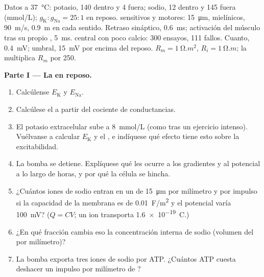 \begin{problem}
\label{pb:b2:neurons-synapses:1}
Datos a \qty{37}{\celsius}: potasio, 140 dentro y 4 fuera; sodio, 12
dentro y 145 fuera (\unit{mmol/L}); $g_{\mathrm K} : g_{\mathrm{Na}} = 25 : 1$
en reposo.  sensitivos y motores: \qty{15}{\micro m}, mielínicos,
\qty{90}{m/s}, \qty{0.9}{m} en cada sentido. Retraso sináptico,
\qty{0.6}{ms}; activación del músculo tras su propio ,
\qty{5}{ms}.  central con poco calcio: 300 ensayos, 111 fallos.
Cuanto, \qty{0.4}{mV}; umbral, \qty{15}{mV} por encima del reposo. $R_m =
\qty{1}{\ohm.m^2}$, $R_i = \qty{1}{\ohm.m}$; la  multiplica $R_m$
por 250.

\medskip
\noindent\textbf{Parte I --- La  en reposo.}
\begin{enumerate}
  \item Calcúlense $E_{\mathrm K}$ y $E_{\mathrm{Na}}$.
  \item Calcúlese el  a partir del cociente de
        conductancias.
  \item El potasio extracelular sube a \qty{8}{mmol/L} (como tras un
        ejercicio intenso). Vuélvanse a calcular $E_{\mathrm K}$ y el
        , e indíquese qué efecto tiene esto sobre la
        excitabilidad.
  \item La bomba se detiene. Explíquese qué les ocurre a los gradientes y
        al potencial a lo largo de horas, y por qué la célula se hincha.
  \item ¿Cuántos iones de sodio entran en un  de \qty{15}{\micro m} por
        milímetro y por impulso si la capacidad de la membrana es de
        \qty{0.01}{F/m^2} y el potencial varía \qty{100}{mV}?
        ($Q = CV$; un ion transporta \qty{1.6e-19}{C}.)
  \item ¿En qué fracción cambia eso la concentración interna de sodio
        (volumen del  por milímetro)?
  \item La bomba exporta tres iones de sodio por ATP. ¿Cuántos ATP
        cuesta deshacer un impulso por milímetro de ?
\end{enumerate}


\end{problem}
